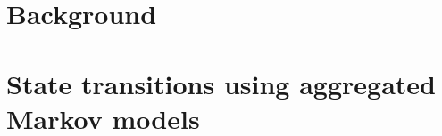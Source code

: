 \documentclass[11pt,a4paper]{report}      %
\begin{document}
\begin{thesisabstract}               %
 \begin{singlespace}       %
  \end{singlespace}
\end{thesisabstract}






\chapter{Background}






\chapter{State transitions using aggregated Markov models}
\label{cha:stamm}

\end{document}
